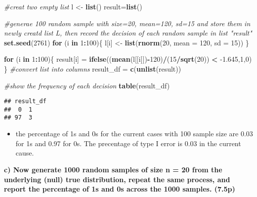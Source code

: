 \documentclass[]{article}
\newenvironment{Shaded}{\begin{snugshade}}{\end{snugshade}}
\newcommand{\CommentTok}[1]{\textcolor[rgb]{0.56,0.35,0.01}{\textit{#1}}}
\newcommand{\ControlFlowTok}[1]{\textcolor[rgb]{0.13,0.29,0.53}{\textbf{#1}}}
\newcommand{\DataTypeTok}[1]{\textcolor[rgb]{0.13,0.29,0.53}{#1}}
\newcommand{\DecValTok}[1]{\textcolor[rgb]{0.00,0.00,0.81}{#1}}
\newcommand{\FloatTok}[1]{\textcolor[rgb]{0.00,0.00,0.81}{#1}}
\newcommand{\KeywordTok}[1]{\textcolor[rgb]{0.13,0.29,0.53}{\textbf{#1}}}
\newcommand{\NormalTok}[1]{#1}
\newcommand{\OperatorTok}[1]{\textcolor[rgb]{0.81,0.36,0.00}{\textbf{#1}}}
\newcommand{\StringTok}[1]{\textcolor[rgb]{0.31,0.60,0.02}{#1}}
\providecommand{\tightlist}{%
  \setlength{\itemsep}{0pt}\setlength{\parskip}{0pt}}
\begin{document}
\begin{Shaded}
\begin{Highlighting}[]
\CommentTok{#creat two empty list}
\NormalTok{  l <-}\StringTok{ }\KeywordTok{list}\NormalTok{()}
\NormalTok{result=}\KeywordTok{list}\NormalTok{()}

\CommentTok{#generae 100 random sample with size=20, mean=120, sd=15 and store them in newly creatd list L, then record the decision of each random sample in list "result"}
\KeywordTok{set.seed}\NormalTok{(}\DecValTok{2761}\NormalTok{)}
\ControlFlowTok{for}\NormalTok{ (i }\ControlFlowTok{in} \DecValTok{1}\OperatorTok{:}\DecValTok{100}\NormalTok{)\{}
\NormalTok{l[i] <-}\StringTok{ }\KeywordTok{list}\NormalTok{(}\KeywordTok{rnorm}\NormalTok{(}\DecValTok{20}\NormalTok{, }\DataTypeTok{mean =} \DecValTok{120}\NormalTok{, }\DataTypeTok{sd =} \DecValTok{15}\NormalTok{))}
\NormalTok{\}}

\ControlFlowTok{for}\NormalTok{ (i }\ControlFlowTok{in} \DecValTok{1}\OperatorTok{:}\DecValTok{100}\NormalTok{)\{}
\NormalTok{result[i] =}\StringTok{ }\KeywordTok{ifelse}\NormalTok{((}\KeywordTok{mean}\NormalTok{(l[[i]])}\OperatorTok{-}\DecValTok{120}\NormalTok{)}\OperatorTok{/}\NormalTok{(}\DecValTok{15}\OperatorTok{/}\KeywordTok{sqrt}\NormalTok{(}\DecValTok{20}\NormalTok{)) }\OperatorTok{<}\StringTok{ }\FloatTok{-1.645}\NormalTok{,}\DecValTok{1}\NormalTok{,}\DecValTok{0}\NormalTok{)}
\NormalTok{\}}
\CommentTok{#convert list into columns}
\NormalTok{result_df =}\StringTok{ }\KeywordTok{c}\NormalTok{(}\KeywordTok{unlist}\NormalTok{(result))}

\CommentTok{#show the frequency of each decision}
\KeywordTok{table}\NormalTok{(result_df)}
\end{Highlighting}
\end{Shaded}

\begin{verbatim}
## result_df
##  0  1 
## 97  3
\end{verbatim}

\begin{itemize}
\tightlist
\item
  the percentage of 1s and 0s for the current cases with 100 sample size
  are 0.03 for 1s and 0.97 for 0s. The precentage of type I error is
  0.03 in the current cause.
\end{itemize}

\textbf{c) Now generate 1000 random samples of size n = 20 from the
underlying (null) true distribution, repeat the same process, and report
the percentage of 1s and 0s across the 1000 samples. (7.5p)}
\end{document}
